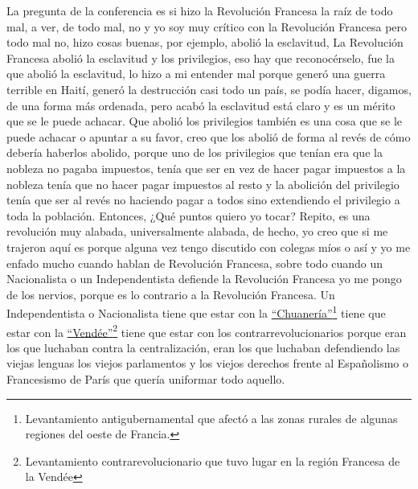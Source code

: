 La pregunta de la conferencia es si hizo la Revolución Francesa la raíz de todo mal, a ver, de todo mal, no y yo soy muy crítico con la Revolución Francesa pero todo mal no, hizo cosas buenas, por ejemplo, abolió la esclavitud, La Revolución Francesa abolió la esclavitud y los privilegios, eso hay que reconocérselo, fue la que abolió la esclavitud, lo hizo a mi entender mal porque generó una guerra terrible en Haití, generó la destrucción casi todo un país, se podía hacer, digamos, de una forma más ordenada, pero acabó la esclavitud está claro y es un mérito que se le puede achacar. Que abolió los privilegios también es una cosa que se le puede achacar o apuntar a su favor, creo que los abolió de forma al revés de cómo debería haberlos abolido, porque uno de los privilegios que tenían era que la nobleza no pagaba impuestos, tenía que ser en vez de hacer pagar impuestos a la nobleza tenía que no hacer pagar impuestos al resto y la abolición del privilegio tenía que ser al revés no haciendo pagar a todos sino extendiendo el privilegio a toda la población. Entonces, ¿Qué puntos quiero yo tocar? Repito, es una revolución muy alabada, universalmente alabada, de hecho, yo creo que si me trajeron aquí es porque alguna vez tengo discutido con colegas míos o así y yo me enfado mucho cuando hablan de Revolución Francesa, sobre todo cuando un Nacionalista o un Independentista defiende la Revolución Francesa yo me pongo de los nervios, porque es lo contrario a la Revolución Francesa. Un Independentista o Nacionalista tiene que estar con la \href{https://en.wikipedia.org/wiki/Chouannerie}{\enquote{Chuanería}}\footnote{Levantamiento antigubernamental que afectó a las zonas rurales de algunas regiones del oeste de Francia.} tiene que estar con la \href{https://en.wikipedia.org/wiki/War_in_the_Vend%C3%A9e}{\enquote{Vendée}}\footnote{Levantamiento contrarevolucionario que tuvo lugar en la región Francesa de la Vendée} tiene que estar con los contrarrevolucionarios porque eran los que luchaban contra la centralización, eran los que luchaban defendiendo las viejas lenguas los viejos parlamentos y los viejos derechos frente al Españolismo o Francesismo de París que quería uniformar todo aquello.

